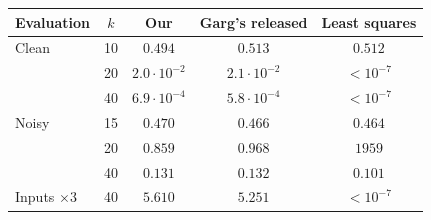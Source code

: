 \begin{tabular}{lcccc}
\toprule
Evaluation & $k$ & Our & Garg's released & Least squares \\
\midrule
Clean & 10 & $0.494$ & $0.513$ & $0.512$ \\
 & 20 & $2.0\cdot10^{-2}$ & $2.1\cdot10^{-2}$ & $<10^{-7}$ \\
 & 40 & $6.9\cdot10^{-4}$ & $5.8\cdot10^{-4}$ & $<10^{-7}$ \\
\midrule
Noisy & 15 & $0.470$ & $0.466$ & $0.464$ \\
 & 20 & $0.859$ & $0.968$ & $1959$ \\
 & 40 & $0.131$ & $0.132$ & $0.101$ \\
\midrule
Inputs $\times 3$ & 40 & $5.610$ & $5.251$ & $<10^{-7}$ \\
\bottomrule
\end{tabular}
